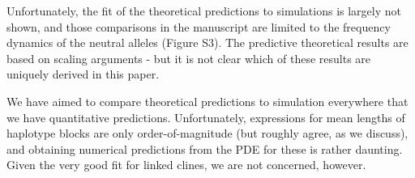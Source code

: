 % 
% 
% 
% 



% 

\begin{point}{}
    Unfortunately, the fit of the theoretical predictions to simulations is largely not shown, and those comparisons in the manuscript are limited to the frequency dynamics of the neutral alleles (Figure S3). The predictive theoretical results are based on scaling arguments - but it is not clear which of these results are uniquely derived in this paper.
\end{point}

\reply
We have aimed to compare theoretical predictions to simulation everywhere that we have quantitative predictions.
Unfortunately, expressions for mean lengths of haplotype blocks are only order-of-magnitude (but roughly agree, as we discuss),
and obtaining numerical predictions from the PDE for these is rather daunting.
Given the very good fit for linked clines, we are not concerned, however.

